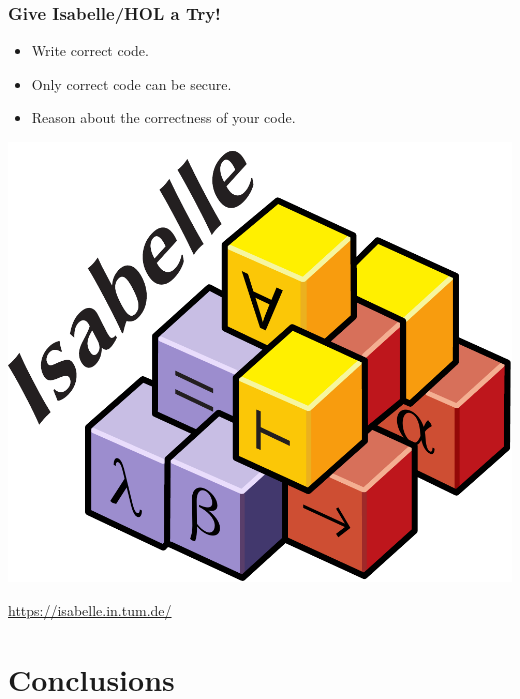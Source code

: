 \documentclass[aspectratio=169]{beamer}
\begin{document}
\begin{frame}
	\frametitle{Give Isabelle/HOL a Try!}
	\begin{itemize}
		\item Write correct code.
		\item Only correct code can be secure.
		\item Reason about the correctness of your code.
	\end{itemize}
	\medskip
	\begin{center}
		\includegraphics[scale=.4]{isabelle.pdf}
	\end{center}
	\url{https://isabelle.in.tum.de/}
\end{frame}



\appendix
\backupbegin

\section{Conclusions}
\end{document}
